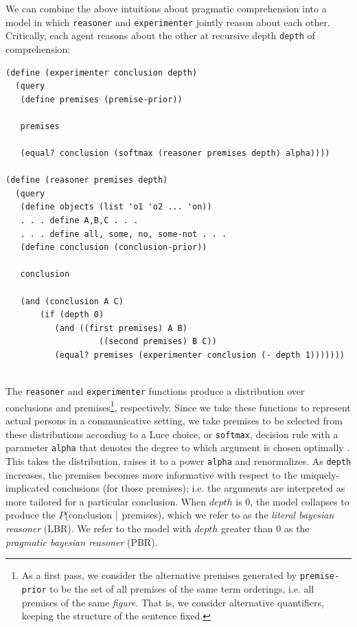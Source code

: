 \documentclass[10pt,letterpaper]{article}
\begin{document}
We can combine the above intuitions about pragmatic comprehension into a model in which \lstinline{reasoner} and \lstinline{experimenter} jointly reason about each other. Critically, each agent reasons about the other at recursive depth \lstinline{depth} of comprehension:
\begin{lstlisting}
(define (experimenter conclusion depth)
  (query 
   (define premises (premise-prior))
   
   premises
   
   (equal? conclusion (softmax (reasoner premises depth) alpha))))

(define (reasoner premises depth)
  (query 
   (define objects (list 'o1 'o2 ... 'on)) 
   . . . define A,B,C . . . 
   . . . define all, some, no, some-not . . .
   (define conclusion (conclusion-prior))
   
   conclusion
   
   (and (conclusion A C)
	   (if (depth 0)
          (and ((first premises) A B)
                   ((second premises) B C))
          (equal? premises (experimenter conclusion (- depth 1)))))))
            
\end{lstlisting}
The \lstinline{reasoner} and \lstinline{experimenter} functions produce a distribution over conclusions and premises\footnote{As a first pass, we consider the alternative premises generated by \lstinline{premise-prior} to be the set of all premises of the same term orderings, i.e. all premises of the same \emph{figure}. That is, we consider alternative quantifiers, keeping the structure of the sentence fixed.}, respectively. Since we take these functions to represent actual persons in a communicative setting, we take premises to be selected from these distributions according to a Luce choice, or \lstinline{softmax}, decision rule with a parameter \lstinline{alpha} that denotes the degree to which argument is chosen optimally \cite{luce1959}. This takes the distribution, raises it to a power \lstinline{alpha} and renormalizes. As \lstinline{depth} increases, the premises becomes more informative with respect to the uniquely-implicated conclusions (for those premises); i.e. the arguments are interpreted as more tailored for a particular conclusion. When $depth$ is 0, the model collapses to produce the $P$(conclusion $\arrowvert$ premises), which we refer to as the \emph{literal bayesian reasoner} (LBR). We refer to the model with $depth$ greater than 0 as the \emph{pragmatic bayesian reasoner} (PBR).
\end{document}
